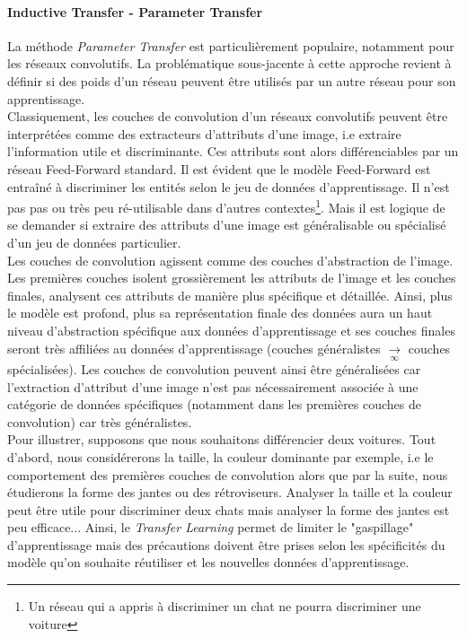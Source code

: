 \paragraph{Inductive Transfer - Parameter Transfer}

\noindent La méthode \textit{Parameter Transfer} est particulièrement populaire, notamment pour les réseaux convolutifs. La problématique sous-jacente à cette approche revient à définir si des poids d'un réseau peuvent être utilisés par un autre réseau pour son apprentissage. \\

\noindent Classiquement, les couches de convolution d'un réseaux convolutifs peuvent être interprétées comme des extracteurs d'attributs d'une image, i.e extraire l'information utile et discriminante. Ces attributs sont alors différenciables par un réseau Feed-Forward standard. Il est évident que le modèle Feed-Forward est entraîné à discriminer les entités selon le jeu de données d'apprentissage. Il n'est pas pas ou très peu ré-utilisable dans d'autres contextes\footnote{Un réseau qui a appris à discriminer un chat ne pourra discriminer une voiture}. Mais il est logique de se demander si extraire des attributs d'une image est généralisable ou spécialisé d'un jeu de données particulier.\\

\noindent Les couches de convolution agissent comme des couches d'abstraction de l'image. Les premières couches isolent grossièrement les attributs de l'image et les couches finales, analysent ces attributs de manière plus spécifique et détaillée. Ainsi, plus le modèle est profond, plus sa représentation finale des données aura un haut niveau d'abstraction spécifique aux données d'apprentissage et ses couches finales seront très affiliées au données d'apprentissage (couches généralistes $\underset{\infty}{\longrightarrow}$ couches spécialisées). Les couches de convolution peuvent ainsi être généralisées car l'extraction d'attribut d'une image n'est pas nécessairement associée à une catégorie de données spécifiques (notamment dans les premières couches de convolution) car très généralistes.\\

\noindent Pour illustrer, supposons que nous souhaitons différencier deux voitures. Tout d'abord, nous considérerons la taille, la couleur dominante par exemple, i.e le comportement des premières couches de convolution alors que par la suite, nous étudierons la forme des jantes ou des rétroviseurs. Analyser la taille et la couleur peut être utile pour discriminer deux chats mais analyser la forme des jantes est peu efficace... Ainsi, le \textit{Transfer Learning} permet de limiter le "gaspillage" d'apprentissage mais des précautions doivent être prises selon les spécificités du modèle qu'on souhaite réutiliser et les nouvelles données d'apprentissage.\\

